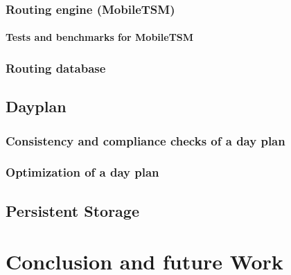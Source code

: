 \documentclass[11pt,a4paper]{scrreprt}
\begin{document}
	\subsection{Routing engine (MobileTSM)} %
	\label{sub:routing_mobiletsm}
	

	\subsubsection{Tests and benchmarks for MobileTSM}
	\label{sub:routing_testcase}
		
		
	\subsection{Routing database} %
	\label{sub:routing_database}
	
			
	\section{Dayplan}
	\label{sub:dayplan}
	
	\subsection{Consistency and compliance checks of a day plan} %
	\label{sub:dayplan}
		
			
	\subsection{Optimization of a day plan} %
	\label{sub:dayplan_optimization}
	
			
	\section{Persistent Storage} %
	\label{sec:android_pers_storage}
	

\chapter{Conclusion and future Work} %
\label{chp:platform_choice}


%
%
\end{document}

